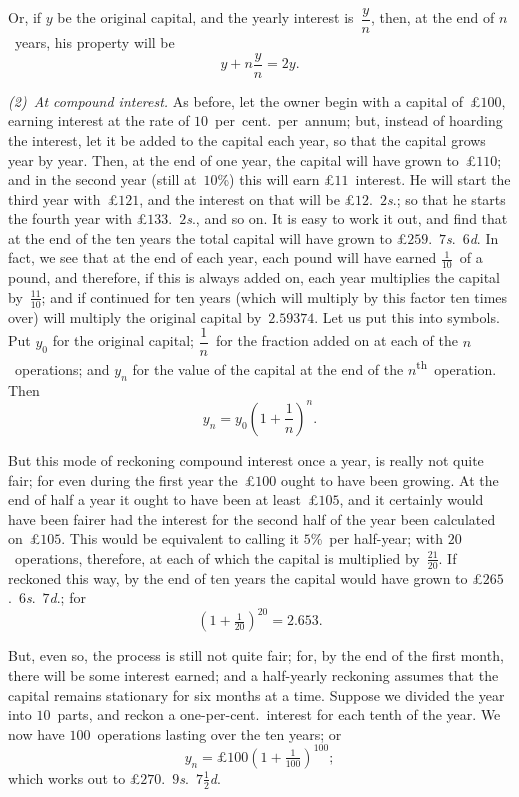 \documentclass[12pt]{book}[2005/09/16]
\newcommand{\Paragraph}[1]{\medskip\pagebreak[1]\par\textit{#1}}
\newcommand{\DPPageSep}[2]{\Pagelabel{#2}}
\newcommand{\Pagelabel}[1]
  {\phantomsection\label{#1}}
\newcommand{\DPtypo}[2]{#2}%
\begin{document}
Or, if $y$ be the original capital, and the yearly
interest is~$\dfrac{y}{n}$, then, at the end of $n$~years, his property
will be
\[
y + n\dfrac{y}{n} = 2y.
\]

\Paragraph{{\upshape(2)}~At compound interest.} As before, let the owner
\Pagelabel{erratum0}%
begin with a capital of~£$100$, earning interest at the
rate of $10$~per~cent.\ per~annum; but, instead of
hoarding the interest, let it be added to the capital
each year, so that the capital grows year by year.
Then, at the end of one year, the capital will have
grown to~£$110$; and in the second year (still at~$10$\%)
this will earn £$11$~interest. He will start the third
year with~£$121$, and the interest on that will be
£$12$.~$2$\textit{s}.; so that he starts the fourth year with
£$133$.~$2$\textit{s}., and so on. It is easy to work it out, and
find that at the end of the ten years the total capital
\DPPageSep{148.png}{136}%
will have grown to £$259$.~$7$\textit{s}.~$6$\textit{d}. In fact, we see that
at the end of each year, each pound will have earned
$\tfrac{1}{10}$~of a pound, and therefore, if this is always added
on, each year multiplies the capital by~$\tfrac{11}{10}$; and if
continued for ten years (which will multiply by this
factor ten times over) will multiply the original
capital by~$\DPtypo{2.59375}{2.59374}$. Let us put this into symbols.
Put $y_0$ for the original capital; $\dfrac{1}{n}$~for the fraction
added on at each of the $n$~operations; and $y_n$ for the
value of the capital at the end of the $n$\textsuperscript{th}~operation.
Then
\[
y_n = y_0\left(1 + \frac{1}{n}\right)^n.
\]

But this mode of reckoning compound interest once
a year, is really not quite fair; for even during the
first year the~£$100$ ought to have been growing. At
the end of half a year it ought to have been at least~£$105$,
and it certainly would have been fairer had
the interest for the second half of the year been
calculated on~£$105$. This would be equivalent to
calling it $5$\%~per half-year; with $20$~operations, therefore,
at each of which the capital is multiplied by~$\tfrac{21}{20}$.
If reckoned this way, by the end of ten years the
capital would have grown to
\DPtypo{£$265$.~$8$\textit{s}.}
       {£$265$.~$6$\textit{s}.~$7$\textit{d}.}; for
\[
(1 + \tfrac{1}{20})^{20} = \DPtypo{2.654}{2.653}.
\]

But, even so, the process is still not quite fair; for,
by the end of the first month, there will be some
interest earned; and a half-yearly reckoning assumes
that the capital remains stationary for six months at
\DPPageSep{149.png}{137}%
a time. Suppose we divided the year into $10$~parts,
and reckon a one-per-cent.\ interest for each tenth of
the year. We now have $100$~operations lasting over
the ten years; or
\[
y_n = £100 \left( 1 + \tfrac{1}{100} \right)^{100};
\]
which works out to
\DPtypo{£$270$.~$8$\textit{s}.}
       {£$270$.~$9$\textit{s}.~$7\frac{1}{2}$\textit{d}.}
\end{document}
